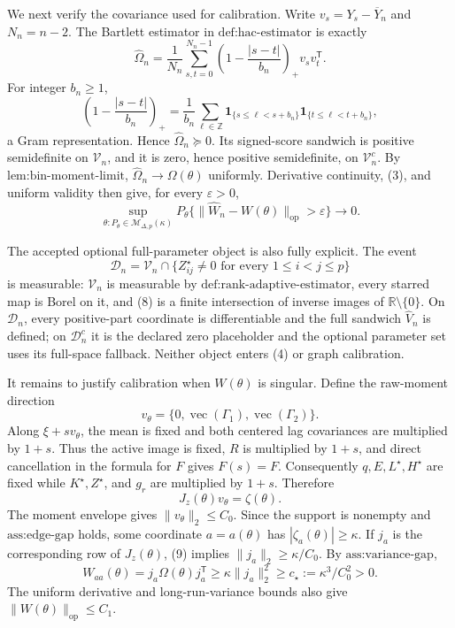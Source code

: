 We next verify the covariance used for calibration.  Write \(v_s=Y_s-\overline Y_n\) and \(N_n=n-2\).  The Bartlett estimator in \(\text{def:hac-estimator}\) is exactly
\[
 \widehat\Omega_n=\frac1{N_n}\sum_{s,t=0}^{N_n-1}
 \left(1-\frac{|s-t|}{b_n}\right)_+v_sv_t^{\mathsf T}.
\tag{5}
\]
For integer \(b_n\geq1\),
\[
 \left(1-\frac{|s-t|}{b_n}\right)_+
 =\frac1{b_n}\sum_{\ell\in\mathbb Z}
 \mathbf1_{\{s\leq\ell<s+b_n\}}
 \mathbf1_{\{t\leq\ell<t+b_n\}},
\tag{6}
\]
a Gram representation.  Hence \(\widehat\Omega_n\succeq0\).  Its signed-score sandwich is positive semidefinite on \(\mathcal V_n\), and it is zero, hence positive semidefinite, on \(\mathcal V_n^c\).  By \(\text{lem:bin-moment-limit}\), \(\widehat\Omega_n\to\Omega(\theta)\) uniformly.  Derivative continuity, (3), and uniform validity then give, for every \(\varepsilon>0\),
\[
 \sup_{\theta:P_\theta\in\mathcal M_{\Delta,p}(\kappa)}
 P_\theta\{\lVert\widehat W_n-W(\theta)\rVert_{\mathrm{op}}>\varepsilon\}
 \longrightarrow0.
\tag{7}
\]

The accepted optional full-parameter object is also fully explicit.  The event
\[
 \mathcal D_n=\mathcal V_n\cap
 \{Z_{ij}^\star\neq0\text{ for every }1\leq i<j\leq p\}
\tag{8}
\]
is measurable: \(\mathcal V_n\) is measurable by \(\text{def:rank-adaptive-estimator}\), every starred map is Borel on it, and (8) is a finite intersection of inverse images of \(\mathbb R\setminus\{0\}\).  On \(\mathcal D_n\), every positive-part coordinate is differentiable and the full sandwich \(\widehat V_n\) is defined; on \(\mathcal D_n^c\) it is the declared zero placeholder and the optional parameter set uses its full-space fallback.  Neither object enters (4) or graph calibration.

It remains to justify calibration when \(W(\theta)\) is singular.  Define the raw-moment direction
\[
 v_\theta=\{0,\operatorname{vec}(\Gamma_1),\operatorname{vec}(\Gamma_2)\}.
\]
Along \(\xi+s v_\theta\), the mean is fixed and both centered lag covariances are multiplied by \(1+s\).  Thus the active image is fixed, \(R\) is multiplied by \(1+s\), and direct cancellation in the formula for \(F\) gives \(F(s)=F\).  Consequently \(q,E,L^\star,H^\star\) are fixed while \(K^\star,Z^\star\), and \(g_r\) are multiplied by \(1+s\).  Therefore
\[
 J_z(\theta)v_\theta=\zeta(\theta).
\tag{9}
\]
The moment envelope gives \(\lVert v_\theta\rVert_2\leq C_0\).  Since the support is nonempty and \(\text{ass:edge-gap}\) holds, some coordinate \(a=a(\theta)\) has \(|\zeta_a(\theta)|\geq\kappa\).  If \(j_a\) is the corresponding row of \(J_z(\theta)\), (9) implies \(\lVert j_a\rVert_2\geq\kappa/C_0\).  By \(\text{ass:variance-gap}\),
\[
 W_{aa}(\theta)=j_a\Omega(\theta)j_a^{\mathsf T}
 \geq\kappa\lVert j_a\rVert_2^2
 \geq c_\star:=\kappa^3/C_0^2>0.
\tag{10}
\]
The uniform derivative and long-run-variance bounds also give \(\lVert W(\theta)\rVert_{\mathrm{op}}\leq C_1\).

